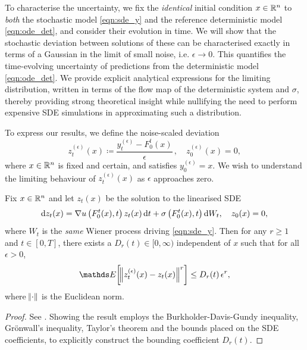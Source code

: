 To characterise the uncertainty, we fix the {\em identical} initial condition \(x  \in \mathbb{R}^n\) to {\em both} the stochastic model \eqref{eqn:sde_y} and the reference deterministic model \eqref{eqn:ode_det}, and consider their evolution in time.  We will show that the stochastic deviation between solutions of these can be characterised exactly in terms of a Gaussian in the limit of small noise, i.e. \(\epsilon \rightarrow 0\).
This quantifies the time-evolving uncertainty of predictions from the deterministic model \eqref{eqn:ode_det}.
We provide explicit analytical expressions for the limiting distribution, written in terms of the flow map of the deterministic system and \(\sigma\), thereby providing strong theoretical insight while nullifying the need to perform
expensive SDE simulations in approximating such a distribution.

To express our results, we define the noise-scaled deviation
\begin{equation}
	z_t^{(\epsilon)}(x) \coloneqq \frac{y_t^{(\epsilon)} - F_0^t(x)}{\epsilon} \, , \quad z_0^{(\epsilon)}(x) = 0,
	\label{eqn:z_def}
\end{equation}
where \(x \in \mathbb{R}^n\) is fixed and certain, and satisfies \(y_0^{(\epsilon)} = x\).
We wish to understand the limiting behaviour of \(z_t^{(\epsilon)}(x)\) as \(\epsilon\) approaches zero.

\begin{theorem}\label{thm:main}
	Fix \(x \in \mathbb{R}^n\) and let \(z_t(x)\) be the solution to the linearised SDE
	\begin{equation}
		\dif z_t(x) = \nabla u\left(F_0^t(x), t\right)z_t(x)\dif t + \sigma\left(F_0^t(x), t\right)\dif W_t, \quad z_0(x) = 0,
		\label{eqn:limit_sde}
	\end{equation}
	where \(W_t\) is the \emph{same} Wiener process driving \eqref{eqn:sde_y}.
	Then for any \(r \geq 1\) and \(t \in [0,T]\), there exists a \( D_r(t) \in [0, \infty) \) independent of \(x\) such that for all \(\epsilon > 0\),
	\begin{equation}
		\avg{\norm{z_t^{(\epsilon)}(x) - z_t(x)}^r} \leq D_r(t)\, \epsilon^r,
		\label{eqn:main_ineq}
	\end{equation}
	where \(\norm{\cdot}\) is the Euclidean norm.

\end{theorem}
\begin{proof}
	See .
	Showing the result employs the Burkholder-Davis-Gundy inequality, Gr\"onwall's inequality, Taylor's theorem and the bounds placed on the SDE coefficients, to explicitly construct the bounding coefficient \(D_r(t)\).
\end{proof}

